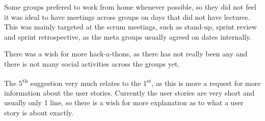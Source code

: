 Some groups prefered to work from home whenever possible, so they did not feel it was ideal to have meetings across groups on days that did not have lectures. This was mainly targeted at the scrum meetings, such as stand-up, sprint review and sprint retrospective, as the meta groups usually agreed on dates internally.

There was a wish for more hack-a-thons, as there has not really been any and there is not many social activities across the groups yet. 

The 5\textsuperscript{th} suggestion very much relates to the 1\textsuperscript{st}, as this is more a request for more information about the user stories. 
Currently the user stories are very short and usually only 1 line, so there is a wish for more explanation as to what a user story is about exactly.
